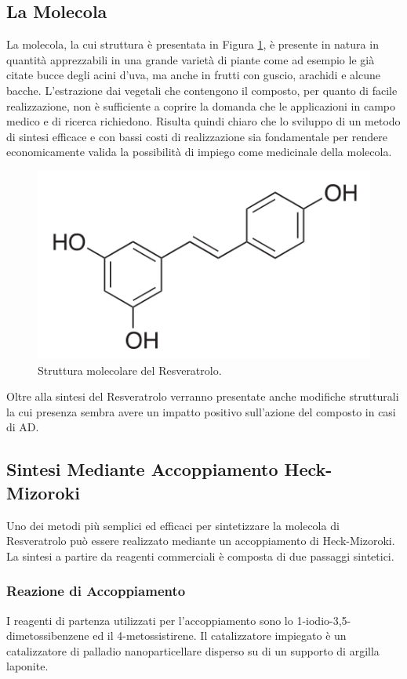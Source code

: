 \documentclass[a4paper, 12pt]{article}
\begin{document}
\subsection{La Molecola}
La molecola, la cui struttura è presentata in Figura \ref{fig:resveratrolo}, è presente in natura in quantità apprezzabili in una grande varietà di piante come ad esempio le già citate bucce degli acini d'uva, ma anche in frutti con guscio, arachidi e alcune bacche. L'estrazione dai vegetali che contengono il composto, per quanto di facile realizzazione, non è sufficiente a coprire la domanda che le applicazioni in campo medico e di ricerca richiedono. Risulta quindi chiaro che lo sviluppo di un metodo di sintesi efficace e con bassi costi di realizzazione sia fondamentale per rendere economicamente valida la possibilità di impiego come medicinale della molecola.
\begin{figure}[H]
	\centering
	\includegraphics[width=.5\linewidth]{immagini/resveratrolo.png}
	\caption{Struttura molecolare del Resveratrolo.}
	\label{fig:resveratrolo}
\end{figure}
Oltre alla sintesi del Resveratrolo verranno presentate anche modifiche strutturali la cui presenza sembra avere un impatto positivo sull'azione del composto in casi di AD.

\subsection{Sintesi Mediante Accoppiamento Heck-Mizoroki}
Uno dei metodi più semplici ed efficaci per sintetizzare la molecola di Resveratrolo può essere realizzato mediante un accoppiamento di Heck-Mizoroki. La sintesi a partire da reagenti commerciali è composta di due passaggi sintetici.

\subsubsection{Reazione di Accoppiamento}
I reagenti di partenza utilizzati per l'accoppiamento sono lo 1-iodio-3,5-dimetossibenzene ed il 4-metossistirene. Il catalizzatore impiegato è un catalizzatore di palladio nanoparticellare disperso su di un supporto di argilla laponite.
\end{document}
